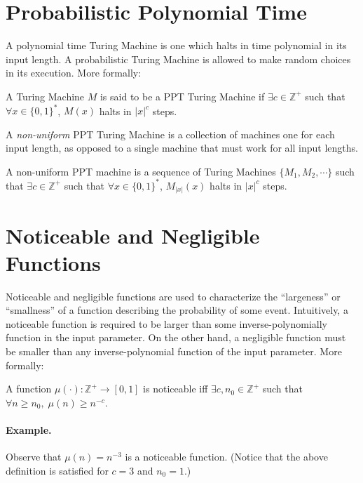 \section{Probabilistic Polynomial Time}
\label{ssec:ppt}
A polynomial time Turing Machine is one which halts in time polynomial in its input length.  A probabilistic Turing Machine is allowed to make random choices in its execution. More formally:
\begin{tcolorbox}[colback=red!5!white]
\begin{definition}
A Turing Machine $M$ is said to be a PPT Turing Machine if $\exists c \in \mathbb{Z}^+$ such that $\forall x \in\{0,1\}^*$, $M(x)$ halts in $|x|^c$ steps.
\end{definition}\end{tcolorbox}
A {\em non-uniform} PPT Turing Machine is a collection of machines one for each input length, as opposed to a single machine that must work for all input lengths.
\begin{tcolorbox}[colback=red!5!white]
\begin{definition}
A non-uniform PPT machine is a sequence of Turing Machines $\{ M_1, M_2, \cdots \}$ such that $\exists c \in \mathbb{Z}^+$ such that $\forall x \in\{0,1\}^*$, $M_{|x|}(x)$ halts in $|x|^c$ steps.
\end{definition}
\end{tcolorbox}

\section{Noticeable and Negligible Functions}
\label{ssec:nnf}
Noticeable and negligible functions are used to characterize the ``largeness'' or ``smallness'' of a function describing the probability of some event.  Intuitively, a noticeable function is required to be larger than some inverse-polynomially function in the input parameter. On the other hand, a negligible function must be smaller than any inverse-polynomial function of the input parameter. More formally:


\begin{definition}
A function $\mu(\cdot): \mathbb{Z}^+ \rightarrow [0,1]$ is noticeable iff $\exists c, n_0 \in \mathbb{Z}^+$ such that $\forall n \geq n_0 , \; \mu(n) \geq n^{-c}$.
\end{definition}

\paragraph{Example.} Observe that $\mu(n) = n^{-3}$ is a noticeable function.  (Notice that the above definition is satisfied for $c = 3$ and $n_0 = 1$.)

